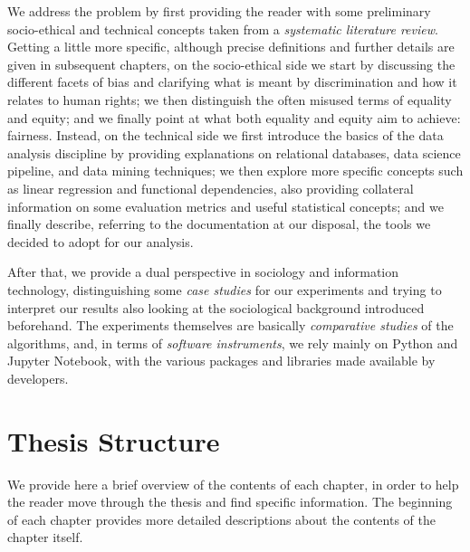 We address the problem by first providing the reader with some preliminary socio-ethical and technical concepts taken from a \textit{systematic literature review}. Getting a little more specific, although precise definitions and further details are given in subsequent chapters, on the socio-ethical side we start by discussing the different facets of bias and clarifying what is meant by discrimination and how it relates to human rights; we then distinguish the often misused terms of equality and equity; and we finally point at what both equality and equity aim to achieve: fairness. Instead, on the technical side we first introduce the basics of the data analysis discipline by providing explanations on relational databases, data science pipeline, and data mining techniques; we then explore more specific concepts such as linear regression and functional dependencies, also providing collateral information on some evaluation metrics and useful statistical concepts; and we finally describe, referring to the documentation at our disposal, the tools we decided to adopt for our analysis.

After that, we provide a dual perspective in sociology and information technology, distinguishing some \textit{case studies} for our experiments and trying to interpret our results also looking at the sociological background introduced beforehand.
The experiments themselves are basically \textit{comparative studies} of the algorithms, and, in terms of \textit{software instruments}, we rely mainly on Python and Jupyter Notebook, with the various packages and libraries made available by developers.


\section{Thesis Structure}
We provide here a brief overview of the contents of each chapter, in order to help the reader move through the thesis and find specific information. The beginning of each chapter provides more detailed descriptions about the contents of the chapter itself.

